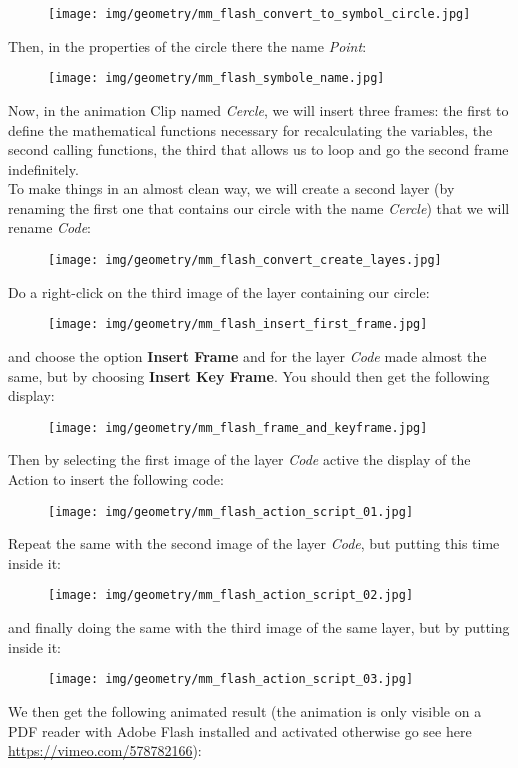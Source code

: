 	\begin{tcolorbox}[colframe=black,colback=white,sharp corners]
	\begin{figure}[H]
		\centering
		\texttt{[image: img/geometry/mm\_flash\_convert\_to\_symbol\_circle.jpg]}
	\end{figure}
	Then, in the properties of the circle there the name \textit{Point}:
	\begin{figure}[H]
		\centering
		\texttt{[image: img/geometry/mm\_flash\_symbole\_name.jpg]}
	\end{figure}
	Now, in the animation Clip named \textit{Cercle}, we will insert three frames: the first to define the mathematical functions necessary for recalculating the variables, the second calling functions, the third that allows us to loop and go the second frame indefinitely.\\
	
	To make things in an almost clean way, we will create a second layer (by renaming the first one that contains our circle with the name \textit{Cercle}) that we will rename \textit{Code}:
	\begin{figure}[H]
		\centering
		\texttt{[image: img/geometry/mm\_flash\_convert\_create\_layes.jpg]}
	\end{figure}
	Do a right-click on the third image of the layer containing our circle:
	\begin{figure}[H]
		\centering
		\texttt{[image: img/geometry/mm\_flash\_insert\_first\_frame.jpg]}
	\end{figure}
	and choose the option \textbf{Insert Frame} and for the layer \textit{Code} made almost the same, but by choosing \textbf{Insert Key Frame}. You should then get the following display:
	\end{tcolorbox}
	
	\begin{tcolorbox}[colframe=black,colback=white,sharp corners]
	\begin{figure}[H]
		\centering
		\texttt{[image: img/geometry/mm\_flash\_frame\_and\_keyframe.jpg]}
	\end{figure}
	Then by selecting the first image of the layer \textit{Code} active the display of the Action to insert the following code:
	\begin{figure}[H]
		\centering
		\texttt{[image: img/geometry/mm\_flash\_action\_script\_01.jpg]}
	\end{figure}	
	Repeat the same with the second image of the layer \textit{Code}, but putting this time inside it:
	\begin{figure}[H]
		\texttt{[image: img/geometry/mm\_flash\_action\_script\_02.jpg]}
	\end{figure}
	and finally doing the same with the third image of the same layer, but by putting inside it:
	\begin{figure}[H]
		\texttt{[image: img/geometry/mm\_flash\_action\_script\_03.jpg]}
	\end{figure}
	We then get the following animated result (the animation is only visible on a PDF reader with Adobe Flash installed and activated otherwise go see here \url{https://vimeo.com/578782166}):	
	\end{tcolorbox}
	
